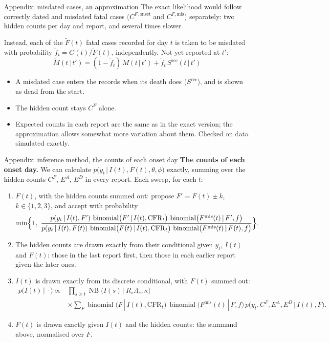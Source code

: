 \documentclass[aspectratio=169,9pt]{beamer}
\newcommand{\given}{\,|\,}
\newcommand{\bin}{\operatorname{binomial}}
\newcommand{\cfr}{\mathrm{CFR}}
\begin{document}
\begin{frame}{Appendix: misdated cases, an approximation}
The exact likelihood would follow correctly dated and misdated fatal cases
($C^{F,\mathrm{onset}}$ and $C^{F,\mathrm{mis}}$) separately: two hidden
counts per day and report, and several times slower.

\bigskip
Instead, each of the $\tilde{F}(t)$ fatal cases recorded for day $t$ is
taken to be misdated with probability $\tilde{f}_t=G(t)/\tilde{F}(t)$,
independently. Not yet reported at $t'$:
\[
\tilde{M}(t\given t')=(1-\tilde{f}_t)\,M(t\given t')+\tilde{f}_t\,S^{\text{rec}}(t\given t')
\]

\begin{itemize}
\item A misdated case enters the records when its death does ($S^{\text{rec}}$),
and is shown as dead from the start.
\item The hidden count stays $C^{F}$ alone.
\item Expected counts in each report are the same as in the exact version;
the approximation allows somewhat more variation about them. Checked on
data simulated exactly.
\end{itemize}
\end{frame}

\begin{frame}{Appendix: inference method, the counts of each onset day}
\textbf{The counts of each onset day.} We can calculate
$p\bigl(y_t\given I(t),F(t),\theta,\phi\bigr)$ exactly, summing over the hidden
counts $C^{F}$, $E^{A}$, $E^{D}$ in every report. Each sweep, for each $t$:

\medskip
\begin{enumerate}
\item $F(t)$, with the hidden counts summed out: propose $F'=F(t)\pm k$, $k\in\{1,2,3\}$,
and accept with probability
\[
\min\Bigl\{1,\ \frac{p(y_t\given I(t),F')\,\bin\bigl(F'\given I(t),\cfr_t\bigr)\,
\bin\bigl(F^{\mathrm{mis}}(t)\given F',f\bigr)}
{p(y_t\given I(t),F(t))\,\bin\bigl(F(t)\given I(t),\cfr_t\bigr)\,
\bin\bigl(F^{\mathrm{mis}}(t)\given F(t),f\bigr)}\Bigr\}.
\]
\item The hidden counts are drawn exactly from their conditional given $y_t$,
$I(t)$ and $F(t)$: those in the last report first, then those in each
earlier report given the later ones.
\item $I(t)$ is drawn exactly from its discrete conditional, with $F(t)$
summed out:
\begin{align*}
p\bigl(I(t)\given\cdot\bigr)\propto{}&\prod_{s\ge t}\operatorname{NB}\bigl(I(s)\given R_s\Lambda_s,\kappa\bigr)\\
&\times\sum_{F}\bin\bigl(F\given I(t),\cfr_t\bigr)\,\bin\bigl(F^{\mathrm{mis}}(t)\given F,f\bigr)\,
p\bigl(y_t,C^{F},E^{A},E^{D}\given I(t),F\bigr).
\end{align*}
\item $F(t)$ is drawn exactly given $I(t)$ and the hidden counts: the summand above,
normalised over $F$.
\end{enumerate}
\end{frame}
\end{document}

